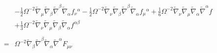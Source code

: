 \documentclass[10pt,letterpaper]{article}
\numberwithin{equation}{section}
\begin{document}
\begin{eqnarray}
&& -  \tfrac{1}{2} \Omega^{-2} \tilde{\nabla}_{\mu }\tilde{\nabla}_{\beta }\tilde{\nabla}^{\beta }\tilde{\nabla}_{\alpha }f_{\nu }{}^{\alpha } -  \tfrac{1}{2} \Omega^{-2} \tilde{\nabla}_{\nu }\tilde{\nabla}_{\beta }\tilde{\nabla}^{\beta }\tilde{\nabla}_{\alpha }f_{\mu }{}^{\alpha } + \tfrac{1}{6} \Omega^{-2} \tilde{\nabla}_{\nu }\tilde{\nabla}_{\mu }\tilde{\nabla}_{\alpha }\tilde{\nabla}^{\alpha }f \nonumber \\ 
&& + \tfrac{1}{3} \Omega^{-2} \tilde{\nabla}_{\nu }\tilde{\nabla}_{\mu }\tilde{\nabla}_{\beta }\tilde{\nabla}_{\alpha }f^{\alpha \beta }
\\ \nonumber\\
&=& \Omega^{-2} \tilde{\nabla}_{\beta }\tilde{\nabla}^{\beta }\tilde{\nabla}_{\alpha }\tilde{\nabla}^{\alpha }F_{\mu \nu }
\end{eqnarray}
\end{document}
